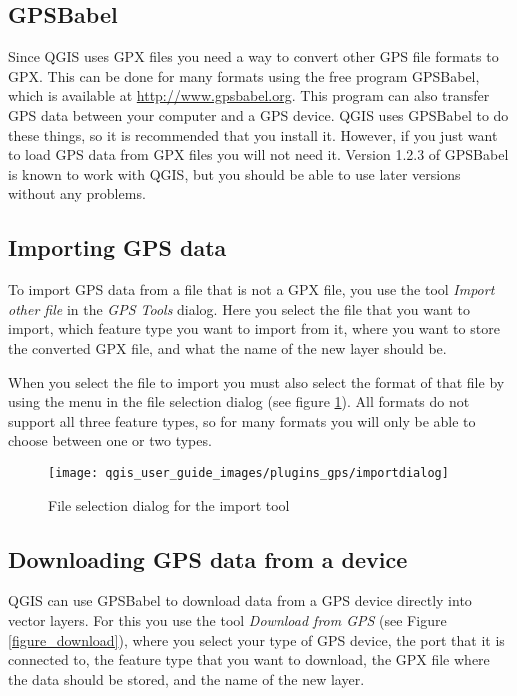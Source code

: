 \subsection{GPSBabel}

Since QGIS uses GPX files you need a way to convert other GPS file
formats to GPX. This can be done for many formats using the free program
GPSBabel, which is available at \url{http://www.gpsbabel.org}. This
program can also transfer GPS data between your computer and a GPS
device. QGIS uses GPSBabel to do these things, so it is recommended
that you install it. However, if you just want to load GPS data from
GPX files you will not need it. Version 1.2.3 of GPSBabel is known
to work with QGIS, but you should be able to use later versions without
any problems.


\subsection{Importing GPS data}

To import GPS data from a file that is not a GPX file, you use the
tool \emph{Import other file} in the \emph{GPS Tools} dialog. Here
you select the file that you want to import, which feature type you
want to import from it, where you want to store the converted GPX
file, and what the name of the new layer should be.

When you select the file to import you must also select the format
of that file by using the menu in the file selection dialog (see figure
\ref{figure importdialog}). All formats do not support all three
feature types, so for many formats you will only be able to choose
between one or two types.

%
\begin{figure}

\caption{\label{figure importdialog}File selection dialog for the import
tool}

\texttt{[image: qgis\_user\_guide\_images/plugins\_gps/importdialog]}
\end{figure}



\subsection{Downloading GPS data from a device}

QGIS can use GPSBabel to download data from a GPS device directly
into vector layers. For this you use the tool \emph{Download from
GPS} (see Figure \ref{figure_download}), where you select your type
of GPS device, the port that it is connected to, the feature type
that you want to download, the GPX file where the data should be stored,
and the name of the new layer.

